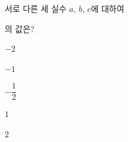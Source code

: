 서로 다른 세 실수 $a$, $b$, $c$에 대하여\par\smallskip{}\par\smallskip\noindent 의 값은?
\begin{choices32}{\rule[-3ex]{0pt}{8ex}$-2$}{\rule[-3ex]{0pt}{8ex}$-1$}{\rule[-3ex]{0pt}{8ex}$-\dfrac{1}{2}$}{\rule[-3ex]{0pt}{8ex}$1$}{\rule[-3ex]{0pt}{8ex}$2$}\end{choices32}
